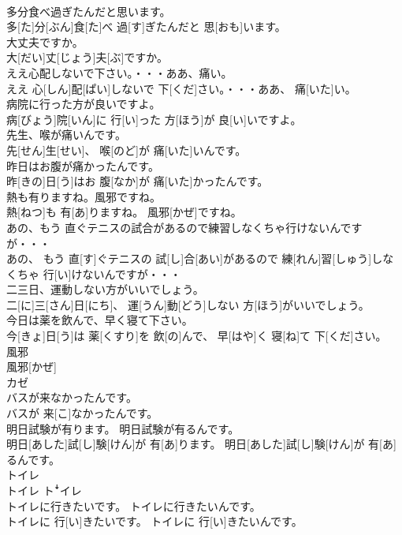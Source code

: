 \documentclass[8pt]{extreport}
\begin{document}
\begin{CJK}{UTF8}{min}
\\	多分食べ過ぎたんだと思います。	
\\	多[た]分[ぶん]食[た]べ 過[す]ぎたんだと 思[おも]います。
\\	大丈夫ですか。	
\\	大[だい]丈[じょう]夫[ぶ]ですか。
\\	ええ心配しないで下さい。・・・ああ、痛い。	
\\	ええ 心[しん]配[ぱい]しないで 下[くだ]さい。・・・ああ、 痛[いた]い。
\\	病院に行った方が良いですよ。	
\\	病[びょう]院[いん]に 行[い]った 方[ほう]が 良[い]いですよ。
\\	先生、喉が痛いんです。	
\\	先[せん]生[せい]、 喉[のど]が 痛[いた]いんです。
\\	昨日はお腹が痛かったんです。	
\\	昨[きの]日[う]はお 腹[なか]が 痛[いた]かったんです。
\\	熱も有りますね。風邪ですね。	
\\	熱[ねつ]も 有[あ]りますね。 風邪[かぜ]ですね。
\\	あの、もう 直ぐテニスの試合があるので練習しなくちゃ行けないんですが・・・	
\\	あの、 もう 直[す]ぐテニスの 試[し]合[あい]があるので 練[れん]習[しゅう]しなくちゃ 行[い]けないんですが・・・
\\	二三日、運動しない方がいいでしょう。	
\\	二[に]三[さん]日[にち]、 運[うん]動[どう]しない 方[ほう]がいいでしょう。
\\	今日は薬を飲んで、早く寝て下さい。	
\\	今[きょ]日[う]は 薬[くすり]を 飲[の]んで、 早[はや]く 寝[ね]て 下[くだ]さい。
\\	風邪	
\\	風邪[かぜ] 
\\	カゼ
\\	バスが来なかったんです。	
\\	バスが 来[こ]なかったんです。
\\	明日試験が有ります。 明日試験が有るんです。	
\\	明日[あした]試[し]験[けん]が 有[あ]ります。 明日[あした]試[し]験[けん]が 有[あ]るんです。
\\	トイレ	
\\	トイレ	トꜜイレ
\\	トイレに行きたいです。 トイレに行きたいんです。	
\\	トイレに 行[い]きたいです。 トイレに 行[い]きたいんです。

\end{CJK}
\end{document}
